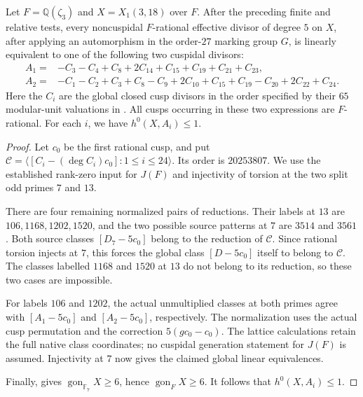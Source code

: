 \begin{lemma}\label{lem:decic318-last-cuspidal-classes}
Let $F=\mathbb Q(\zeta_3)$ and $X=X_1(3,18)$ over $F$.
After the preceding finite and relative tests, every noncuspidal
$F$-rational effective divisor of degree $5$ on $X$, after applying
an automorphism in the order-$27$ marking group $G$, is linearly
equivalent to one of the following two cuspidal divisors:
\[
\begin{split}
 A_1={}&-C_3-C_4+C_8+2C_{14}+C_{15}+C_{19}+C_{21}+C_{23},\\
 A_2={}&-C_1-C_2+C_3+C_8-C_9+2C_{10}+C_{15}+C_{19}
          -C_{20}+2C_{22}+C_{24}.
\end{split}
\]
Here the $C_i$ are the global closed cusp divisors in the order
specified by their $65$ modular-unit valuations in
. All cusps occurring in these
two expressions are $F$-rational. For each $i$, we have
$h^0(X,A_i)\leq1$.
\end{lemma}
\begin{proof}
Let $c_0$ be the first rational cusp, and put
$\mathcal C=\langle[C_i-(\deg C_i)c_0]:1\leq i\leq24\rangle$.
Its order is $20253807$. We use the established rank-zero
input for $J(F)$ and injectivity of torsion at the two split
odd primes $7$ and $13$.

There are four remaining normalized pairs of reductions. Their labels
at $13$ are $106,1168,1202,1520$, and the two possible source
patterns at $7$ are $3514$ and $3561$.
Both source classes $[D_7-5c_0]$ belong to the reduction of
$\mathcal C$. Since rational torsion injects at $7$, this forces
the global class $[D-5c_0]$ itself to belong to $\mathcal C$.
The classes labelled $1168$ and $1520$ at $13$ do not belong
to its reduction, so these two cases are impossible.

For labels $106$ and $1202$, the actual unmultiplied classes
at both primes agree with $[A_1-5c_0]$ and $[A_2-5c_0]$,
respectively. The normalization uses the actual cusp
permutation and the correction $5(gc_0-c_0)$.
The lattice calculations retain the full native class
coordinates; no cuspidal generation statement for $J(F)$
is assumed. Injectivity at $7$ now gives the claimed global
linear equivalences.

Finally, \cite[Table~1]{NV} gives
$\operatorname{gon}_{\mathbb F_7}X\geq6$, hence
$\operatorname{gon}_F X\geq6$. It follows that
$h^0(X,A_i)\leq1$.
\end{proof}

